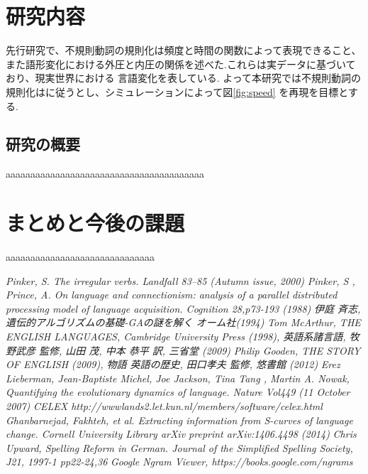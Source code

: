 \documentclass[10.5pt, a4j, twocolumn]{jsarticle}
\begin{document}
\section{研究内容}
先行研究\cite{Lieberman, scurve}で、不規則動詞の規則化は頻度と時間の関数によって表現できること、
また語形変化における外圧と内圧の関係を述べた.これらは実データに基づいており、現実世界における
言語変化を表している.
よって本研究では不規則動詞の規則化は\cite{Lieberman}に従うとし、シミュレーションによって図\ref{fig:speed}
を再現を目標とする.


\subsection{研究の概要}\label{sec:abst}
aaaaaaaaaaaaaaaaaaaaaaaaaaaaaaaaaaaaaaaa

\section{まとめと今後の課題}
aaaaaaaaaaaaaaaaaaaaaaaaaaaaaa

{\small
\begin{thebibliography}{9}
   \emph{Pinker, S. The irregular verbs. Landfall 83–85 (Autumn issue, 2000)}
   \emph{Pinker, S , Prince, A. On language and connectionism: analysis of a parallel distributed processing model of language acquisition. Cognition 28,p73-193 (1988)}
   \emph{伊庭 斉志, 遺伝的アルゴリズムの基礎-GAの謎を解く オーム社(1994)}
   \emph{Tom McArthur, THE ENGLISH LANGUAGES, Cambridge University Press (1998), 英語系諸言語, 牧野武彦 監修, 山田 茂, 中本 恭平 訳, 三省堂 (2009)}
   \emph{Philip Gooden, THE STORY OF ENGLISH (2009), 物語 英語の歴史, 田口孝夫 監修, 悠書館 (2012)}
    \emph{Erez Lieberman, Jean-Baptiste Michel, Joe Jackson, Tina Tang , Martin A. Nowak, Quantifying the evolutionary dynamics of language. Nature Vol449 (11 October 2007)}
    \emph{CELEX http://wwwlands2.let.kun.nl/members/software/celex.html}
    \emph{Ghanbarnejad, Fakhteh, et al. Extracting information from S-curves of language change. Cornell University Library arXiv preprint arXiv:1406.4498 (2014)}
    \emph{Chris Upward, Spelling Reform in German. Journal of the Simplified Spelling Society, J21, 1997-1 pp22-24,36}
    \emph{Google Ngram Viewer, https://books.google.com/ngrams}
\end{thebibliography}
}
\end{document}
